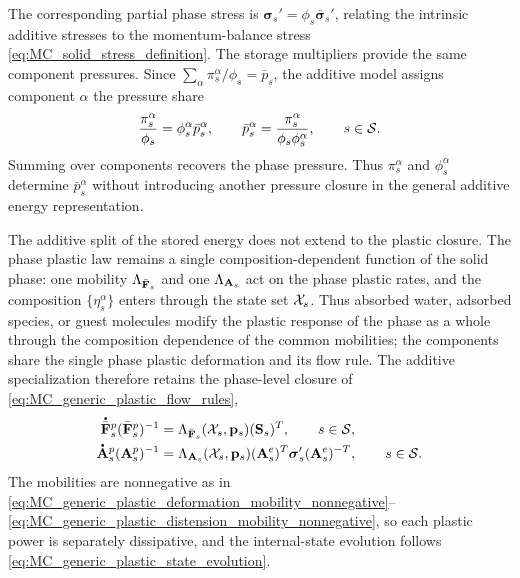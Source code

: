 %
The corresponding partial phase stress is
\(\boldsymbol\sigma_s'=\phi_s\bar{\boldsymbol\sigma}_s'\), relating the
intrinsic additive stresses to the momentum-balance stress
\eqref{eq:MC_solid_stress_definition}.
%
The storage multipliers provide the same component pressures.  Since
\(\sum_\alpha\pi_s^\alpha/\phi_s=\bar p_s\), the additive model assigns
component \(\alpha\) the pressure share
%
\begin{equation}
	\frac{\pi_s^\alpha}{\phi_s}
	=
	\phi_s^\alpha\bar p_s^\alpha,
	\qquad
	\bar p_s^\alpha
	=
	\frac{\pi_s^\alpha}{\phi_s\phi_s^\alpha},
	\qquad
	s\in\mathcal{S} .
	\label{eq:additive_component_pressure_multiplier_identity}
\end{equation}
%
Summing over components recovers the phase pressure.  Thus
\(\pi_s^\alpha\) and \(\phi_s^\alpha\) determine
\(\bar p_s^\alpha\) without introducing another pressure closure in the general
additive energy representation.

The additive split of the stored energy does not extend to the plastic
closure.  The phase plastic law remains a single composition-dependent
function of the solid phase: one mobility \(\Lambda_{\bar{\mathbf{F}}_s}\) and one
\(\Lambda_{\mathbf{A}_s}\) act on the phase plastic rates, and the composition
\(\{\eta_s^\alpha\}\) enters through the state set \(\mathcal{X}_s\).  Thus absorbed
water, adsorbed species, or guest molecules modify the plastic response of the
phase as a whole through the composition dependence of the common mobilities;
the components share the single phase plastic deformation and its flow rule.
The additive specialization therefore retains the phase-level closure of
\eqref{eq:MC_generic_plastic_flow_rules},
%
\begin{subequations}
	\label{eq:MC_additive_plastic_flow_rules}
	\begin{align}
		\phasedot{\bar{\mbf F}}_s^p(\bar{\mbf F}_s^p)^{-1}
		 & =
		\Lambda_{\bar{\mbf F}_s}(\mc X_s,\mbf p_s)
		(\mbf S_s)^T,
		\qquad
		s\in\mc S,
		\label{eq:MC_additive_plastic_deformation_flow_rule} \\
		\phasedot{\mbf A}_s^p(\mbf A_s^p)^{-1}
		 & =
		\Lambda_{\mbf A_s}(\mc X_s,\mbf p_s)
		(\mbf A_s^e)^T
		\bs\sigma_s'
		(\mbf A_s^e)^{-T},
		\qquad
		s\in\mc S .
		\label{eq:MC_additive_plastic_distension_flow_rule}
	\end{align}
\end{subequations}
%
The mobilities are nonnegative as in
\eqref{eq:MC_generic_plastic_deformation_mobility_nonnegative}--\eqref{eq:MC_generic_plastic_distension_mobility_nonnegative},
so each plastic power is separately dissipative, and the internal-state
evolution follows \eqref{eq:MC_generic_plastic_state_evolution}.

